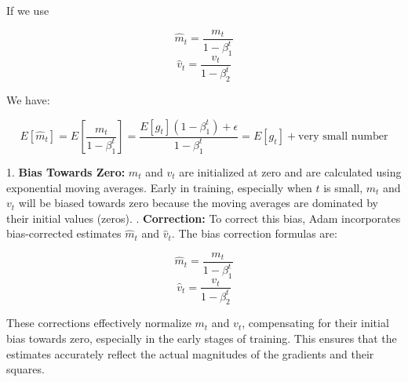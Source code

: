 \begin{qsolve}
\begin{qsolve}[]
        If we use

        \[
        \hat{m}_t = \frac{m_t}{1 - \beta_1^t}
        \]
        \[
        \hat{v}_t = \frac{v_t}{1 - \beta_2^t}
        \]

        We have:

        \[
        E[\hat{m}_t] = E\left[ \frac{m_t}{1 - \beta_1^t} \right] = \frac{E[g_t](1 - \beta_1^t) + \epsilon}{1 - \beta_1^t} = E[g_t] + \text{very small number}
        \]

        1. \textbf{Bias Towards Zero:} \( m_t \) and \( v_t \) are initialized at zero and are calculated using exponential moving averages. Early in training, especially when \( t \) is small, \( m_t \) and \( v_t \) will be biased towards zero because the moving averages are dominated by their initial values (zeros).
        . \textbf{Correction:} To correct this bias, Adam incorporates bias-corrected estimates \( \hat{m}_t \) and \( \hat{v}_t \). The bias correction formulas are:

        \[
        \hat{m}_t = \frac{m_t}{1 - \beta_1^t}
        \]
        \[
        \hat{v}_t = \frac{v_t}{1 - \beta_2^t}
        \]

        These corrections effectively normalize \( m_t \) and \( v_t \), compensating for their initial bias towards zero, especially in the early stages of training. This ensures that the estimates accurately reflect the actual magnitudes of the gradients and their squares.

    \end{qsolve}
\end{qsolve}
